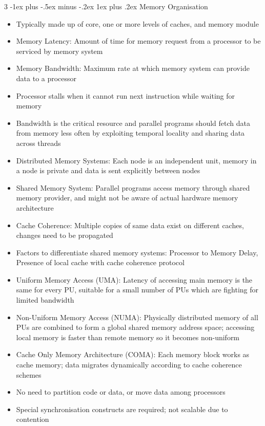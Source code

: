 \documentclass[10pt, landscape]{article}
\makeatletter
\renewcommand{\subsection}{\@startsection{subsection}{3}{0mm}%
                                {-1ex plus -.5ex minus -.2ex}%
                                {1ex plus .2ex}%
                                {\normalfont\small\bfseries}}%
\makeatother
\begin{document}
\begin{multicols*}{3}
\subsection{Memory Organisation}
\begin{itemize}
    \item Typically made up of core, one or more levels of caches, and memory module
    \item Memory Latency: Amount of time for memory request from a processor to be serviced by memory system
    \item Memory Bandwidth: Maximum rate at which memory system can provide data to a processor
    \item Processor stalls when it cannot run next instruction while waiting for memory
    \item Bandwidth is the critical resource and parallel programs should fetch data from memory less often by exploiting temporal locality and sharing data across threads
    \item Distributed Memory Systems: Each node is an independent unit, memory in a node is private and data is sent explicitly between nodes
    \item Shared Memory System: Parallel programs access memory through shared memory provider, and might not be aware of actual hardware memory architecture
    \item Cache Coherence: Multiple copies of same data exist on different caches, changes need to be propagated
    \item Factors to differentiate shared memory systems: Processor to Memory Delay, Presence of local cache with cache coherence protocol
    \item Uniform Memory Access (UMA): Latency of accessing main memory is the same for every PU, suitable for a small number of PUs which are fighting for limited bandwidth
    \item Non-Uniform Memory Access (NUMA): Physically distributed memory of all PUs are combined to form a global shared memory address space; accessing local memory is faster than remote memory so it becomes non-uniform
    \item Cache Only Memory Architecture (COMA): Each memory block works as cache memory; data migrates dynamically according to cache coherence schemes
    \item No need to partition code or data, or move data among processors
    \item Special synchronisation constructs are required; not scalable due to contention
\end{itemize}


\end{multicols*}
\end{document}
